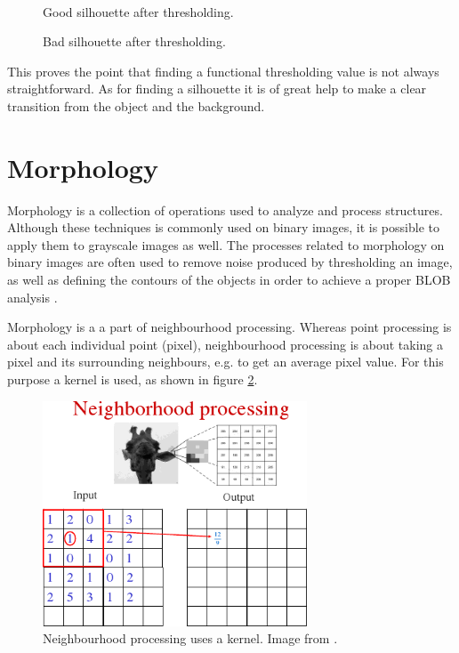 \begin{figure}[htbp]
\begin{minipage}[b]{0.45\textwidth}
\end{minipage} \\ %
\begin{minipage}[t]{0.45\textwidth}
\caption{Good silhouette after thresholding.} %
\label{fig:SimpleThresholdAfter}
\end{minipage} \hfill
\begin{minipage}[t]{0.45\textwidth}
\caption{Bad silhouette after thresholding.} %
\label{fig:ComplicatedThresholdAfter}
\end{minipage}
\end{figure}
 
This proves the point that finding a functional thresholding value is not always straightforward. As for finding a silhouette it is of great help to make a clear transition from the object and the background.

\section{Morphology}
Morphology is a collection of operations used to analyze and process structures. Although these techniques is commonly used on binary images, it is possible to apply them to grayscale images as well. The processes related to morphology on binary images are often used to remove noise produced by thresholding an image, as well as defining the contours of the objects in order to achieve a proper BLOB analysis \citep{ip_book}.

Morphology is a a part of neighbourhood processing. Whereas point processing is about each individual point (pixel), neighbourhood processing is about taking a pixel and its surrounding neighbours, e.g. to get an average pixel value. For this purpose a kernel is used, as shown in figure \ref{fig:kernel}.

\begin{figure}[htbp]
\centering
\includegraphics[width=0.7\textwidth]{Pictures/Theory/kernel}
\caption{Neighbourhood processing uses a kernel. Image from \citep{ip_book}.}
\label{fig:kernel}
\end{figure}

